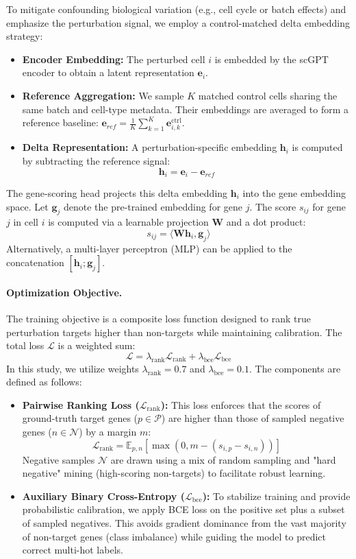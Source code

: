 \documentclass{article}
\begin{document}
To mitigate confounding biological variation (e.g., cell cycle or batch effects) and emphasize the perturbation signal, we employ a control-matched delta embedding strategy:
\begin{itemize}
    \item \textbf{Encoder Embedding:} The perturbed cell $i$ is embedded by the scGPT encoder to obtain a latent representation $\mathbf{e}_i$.
    \item \textbf{Reference Aggregation:} We sample $K$ matched control cells sharing the same batch and cell-type metadata. Their embeddings are averaged to form a reference baseline: $\mathbf{e}_{ref} = \frac{1}{K}\sum_{k=1}^K \mathbf{e}_{i,k}^{\text{ctrl}}$.
    \item \textbf{Delta Representation:} A perturbation-specific embedding $\mathbf{h}_i$ is computed by subtracting the reference signal:
    \[
    \mathbf{h}_i = \mathbf{e}_i - \mathbf{e}_{ref}
    \]
\end{itemize}
The gene-scoring head projects this delta embedding $\mathbf{h}_i$ into the gene embedding space. Let $\mathbf{g}_j$ denote the pre-trained embedding for gene $j$. The score $s_{ij}$ for gene $j$ in cell $i$ is computed via a learnable projection $\mathbf{W}$ and a dot product:
\[
s_{ij} = \langle \mathbf{W} \mathbf{h}_i, \mathbf{g}_j \rangle
\]
Alternatively, a multi-layer perceptron (MLP) can be applied to the concatenation $[\mathbf{h}_i; \mathbf{g}_j]$.

\paragraph{Optimization Objective.}
The training objective is a composite loss function designed to rank true perturbation targets higher than non-targets while maintaining calibration. The total loss $\mathcal{L}$ is a weighted sum:
\[
\mathcal{L} = \lambda_{\text{rank}}\mathcal{L}_{\text{rank}} + \lambda_{\text{bce}}\mathcal{L}_{\text{bce}}
\]
In this study, we utilize weights $\lambda_{\text{rank}}=0.7$ and $\lambda_{\text{bce}}=0.1$. The components are defined as follows:
\begin{itemize}
    \item \textbf{Pairwise Ranking Loss ($\mathcal{L}_{\text{rank}}$):} This loss enforces that the scores of ground-truth target genes ($p \in \mathcal{P}$) are higher than those of sampled negative genes ($n \in \mathcal{N}$) by a margin $m$:
    \[
    \mathcal{L}_{\text{rank}} = \mathbb{E}_{p, n} \left[ \max(0, m - (s_{i,p} - s_{i,n})) \right]
    \]
    Negative samples $\mathcal{N}$ are drawn using a mix of random sampling and "hard negative" mining (high-scoring non-targets) to facilitate robust learning.
    \item \textbf{Auxiliary Binary Cross-Entropy ($\mathcal{L}_{\text{bce}}$):} To stabilize training and provide probabilistic calibration, we apply BCE loss on the positive set plus a subset of sampled negatives. This avoids gradient dominance from the vast majority of non-target genes (class imbalance) while guiding the model to predict correct multi-hot labels.
\end{itemize}
\end{document}
